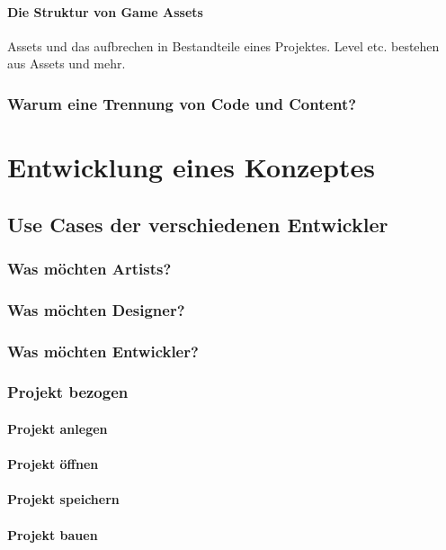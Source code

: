 \documentclass[pagesize, paper=a4, fontsize=12pt,titlepage=true, headings=small, headnosepline, abstractoff, liststotoc, nochapterprefix, plainheadsepline, twoside]{scrreprt}
\begin{document}
\subsubsection{Die Struktur von Game Assets}
Assets und das aufbrechen in Bestandteile eines Projektes. Level etc. bestehen aus Assets und mehr.
\subsection{Warum eine Trennung von Code und Content?}

\chapter{Entwicklung eines Konzeptes}

\section{Use Cases der verschiedenen Entwickler}
\subsection{Was möchten Artists?}
\subsection{Was möchten Designer?}
\subsection{Was möchten Entwickler?}

\subsection{Projekt bezogen}
\subsubsection{Projekt anlegen}
\subsubsection{Projekt öffnen}
\subsubsection{Projekt speichern}
\subsubsection{Projekt bauen}
\end{document}

